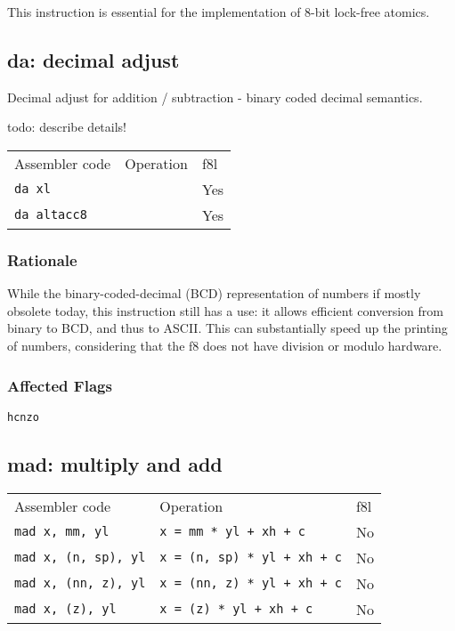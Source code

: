 \documentclass{book}
\begin{document}
This instruction is essential for the implementation of 8-bit lock-free atomics.


\subsection{da: decimal adjust}

Decimal adjust for addition / subtraction - binary coded decimal semantics.

todo: describe details!

\begin{tabular}{l l l}
Assembler code      & Operation & f8l \\
\texttt{da xl}      &           & Yes \\
\texttt{da altacc8} &           & Yes \\
\end{tabular}

\subsubsection*{Rationale}

While the binary-coded-decimal (BCD) representation of numbers if mostly obsolete today, this instruction still has a use: it allows efficient conversion from binary to BCD, and thus to ASCII. This can substantially speed up the printing of numbers, considering that the f8 does not have division or modulo hardware.


\subsubsection*{Affected Flags}

\texttt{hcnzo}


\subsection{mad: multiply and add}

\begin{tabular}{l l l}
Assembler code              & Operation                          & f8l \\
\texttt{mad x, mm, yl}      & \texttt{x = mm * yl + xh + c}      & No \\
\texttt{mad x, (n, sp), yl} & \texttt{x = (n, sp) * yl + xh + c} & No \\
\texttt{mad x, (nn, z), yl} & \texttt{x = (nn, z) * yl + xh + c} & No \\
\texttt{mad x, (z), yl}     & \texttt{x = (z) * yl + xh + c}     & No \\
\end{tabular}
\end{document}

